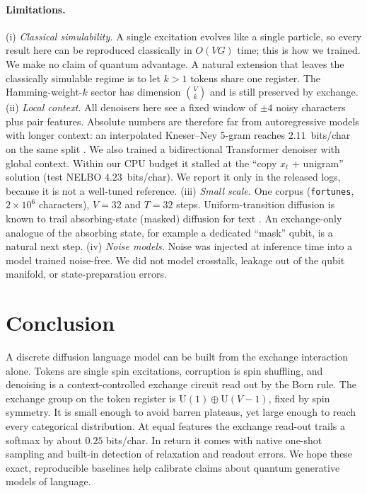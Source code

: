 \paragraph{Limitations.}
(i) \emph{Classical simulability.} A single excitation evolves like a single particle, so every result
here can be reproduced classically in $O(VG)$ time; this is how we trained. We make no claim of quantum
advantage. A natural extension that leaves the classically simulable regime is to let $k>1$ tokens
share one register. The Hamming-weight-$k$ sector has dimension $\binom{V}{k}$ and is still preserved by
exchange.
(ii) \emph{Local context.} All denoisers here see a fixed window of $\pm4$ noisy characters plus pair
features. Absolute numbers are therefore far from autoregressive models with longer context: an
interpolated Kneser--Ney 5-gram reaches $2.11$~bits/char on the same split \citep{chen1999empirical}.
We also trained a bidirectional Transformer denoiser with global context. Within our CPU budget it
stalled at the ``copy $x_t$ + unigram'' solution (test NELBO $4.23$~bits/char). We report it only in
the released logs, because it is not a well-tuned reference.
(iii) \emph{Small scale.} One corpus (\texttt{fortunes}, $2\times10^6$ characters), $V=32$ and $T=32$
steps. Uniform-transition diffusion is known to trail absorbing-state (masked) diffusion for text
\citep{austin2021structured,sahoo2024simple}. An exchange-only analogue of the absorbing state, for
example a dedicated ``mask'' qubit, is a natural next step.
(iv) \emph{Noise models.} Noise was injected at inference time into a model trained noise-free. We did
not model crosstalk, leakage out of the qubit manifold, or state-preparation errors.

\section{Conclusion}
A discrete diffusion language model can be built from the exchange interaction alone. Tokens are single
spin excitations, corruption is spin shuffling, and denoising is a context-controlled exchange circuit
read out by the Born rule. The exchange group on the token register is $\mathrm{U}(1)\oplus\mathrm{U}(V-1)$,
fixed by spin symmetry. It is small enough to avoid barren plateaus, yet large enough to reach every
categorical distribution. At equal features the exchange read-out trails a softmax by about $0.25$
bits/char. In return it comes with native one-shot sampling and built-in detection of relaxation and
readout errors. We hope these exact, reproducible baselines help calibrate claims about quantum
generative models of language.
